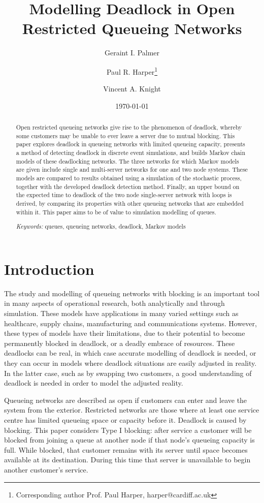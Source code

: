 \documentclass{article}
\title{Modelling Deadlock in Open Restricted Queueing Networks}
\author{Geraint I. Palmer}
\author{Paul R. Harper\thanks{Corresponding author Prof. Paul Harper, harper@cardiff.ac.uk}}
\author{Vincent A. Knight}
\affil{\small{\textit{School of Mathematics, Cardiff University, Senghennydd Road, Cardiff, CF24 4AG}}}
\date{\today}
\numberwithin{equation}{section}
\begin{document}
\onehalfspacing

\maketitle


\begin{abstract}
Open restricted queueing networks give rise to the phenomenon of deadlock,
whereby some customers may be unable to ever leave a server due to mutual
blocking.
This paper explores deadlock in queueing networks with limited queueing
capacity, presents a method of detecting deadlock in discrete event
simulations, and builds Markov chain models of these deadlocking networks.
The three networks for which Markov models are given include single and
multi-server networks for one and two node systems.
These models are compared to results obtained using a simulation of the
stochastic process, together with the developed deadlock detection method.
Finally, an upper bound on the expected time to deadlock of the two node
single-server network with loops is derived, by comparing its properties with
other queueing networks that are embedded within it.
This paper aims to be of value to simulation modelling of queues.

\textit{Keywords:} queues, queueing networks, deadlock, Markov models
\end{abstract}

\section{Introduction}

The study and modelling of queueing networks with blocking is an important
tool in many aspects of operational research, both analytically and through
simulation.
These models have applications in many varied settings such as healthcare,
supply chains, manufacturing and communications systems.
However, these types of models have their limitations, due to their potential
to become permanently blocked in deadlock, or a deadly embrace of resources.
These deadlocks can be real, in which case accurate modelling of deadlock is
needed, or they can occur in models where deadlock situations are easily
adjusted in reality.
In the latter case, such as by swapping two customers, a good understanding of
deadlock is needed in order to model the adjusted reality.

Queueing networks are described as open if customers can enter and leave the
system from the exterior.
Restricted networks are those where at least one service centre has limited
queueing space or capacity before it.
Deadlock is caused by blocking.
This paper considers Type I blocking: after service a customer will be blocked
from joining a queue at another node if that node's queueing capacity is full.
While blocked, that customer remains with its server until space becomes
available at its destination.
During this time that server is unavailable to begin another customer's
service.
\end{document}
